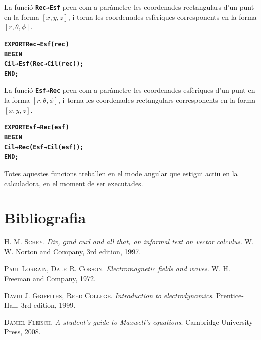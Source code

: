 \documentclass[catalan,a4paper,twoside,11pt]{article}
\begin{document}
La funció \texttt{\textbf{Rec→Esf}} pren com a paràmetre les coordenades rectangulars  d'un punt en la forma $[x,y,z]$, i torna les coordenades esfèriques corresponents en la forma $[r,\theta,\phi]$.
\vspace{-6mm}
\begin{alltt}
\bfseries
    EXPORT Rec→Esf(rec)
    BEGIN
      Cil→Esf(Rec→Cil(rec));
    END;
\end{alltt}

La funció \texttt{\textbf{Esf→Rec}} pren com a paràmetre les coordenades esfèriques d'un punt en la forma $[r,\theta,\phi]$, i torna les coordenades rectangulars corresponents en la forma $[x,y,z]$.
\vspace{-6mm}
\begin{alltt}
\bfseries
    EXPORT Esf→Rec(esf)
    BEGIN
      Cil→Rec(Esf→Cil(esf));
    END;
\end{alltt}


Totes aquestes funcions treballen en el mode angular que estigui actiu en la calculadora, en el moment de ser executades.



\section{Bibliografia}

\textsc{H. M. Schey}. \textsl{Div, grad curl and all that, an informal text on vector calculus}.  W. W. Norton and Company, 3rd edition, 1997.

\textsc{Paul Lorrain, Dale R. Corson}. \textsl{Electromagnetic fields and waves}.  W. H. Freeman and Company, 1972.

\textsc{David J. Griffiths, Reed College}. \textsl{Introduction to electrodynamics}. Prentice-Hall, 3rd edition, 1999.

\textsc{Daniel Fleisch}. \textsl{A student's guide to Maxwell's equations}. Cambridge University Press, 2008.
\end{document}
